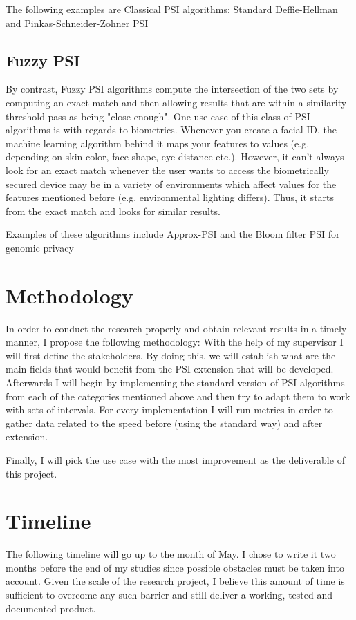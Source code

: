 \documentclass{article}
\begin{document}
The following examples are Classical PSI algorithms: Standard Deffie-Hellman and Pinkas-Schneider-Zohner PSI

\subsection{Fuzzy PSI}
By contrast, Fuzzy PSI algorithms compute the intersection of the two sets by computing an exact match and then allowing 
results that are within a similarity threshold pass as being "close enough". One use case of this class of PSI algorithms 
is with regards to biometrics. Whenever you create a facial ID, the machine learning algorithm behind it maps your features
to values (e.g. depending on skin color, face shape, eye distance etc.). However, it can't always look for an exact match whenever
the user wants to access the biometrically secured device may be in a variety of environments which affect values for the features 
mentioned before (e.g. environmental lighting differs). Thus, it starts from the exact match and looks for similar results.

Examples of these algorithms include Approx-PSI and the Bloom filter PSI for genomic privacy
 

\section{Methodology}
In order to conduct the research properly and obtain relevant results in a timely manner, I propose the following methodology:
With the help of my supervisor I will first define the stakeholders. By doing this, we will establish what are the main fields that
would benefit from the PSI extension that will be developed. Afterwards I will begin by implementing the standard version of PSI algorithms
from each of the categories mentioned above and then try to adapt them to work with sets of intervals. For every implementation I will run metrics
in order to gather data related to the speed before (using the standard way) and after extension.

Finally, I will pick the use case with the most improvement as the deliverable of this project.
\section{Timeline}
The following timeline will go up to the month of May. I chose to write it two months before the end of my studies since possible obstacles must 
be taken into account. Given the scale of the research project, I believe this amount of time is sufficient to overcome any such barrier and still
deliver a working, tested and documented product. 
\end{document}
